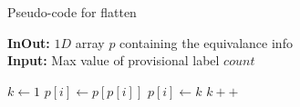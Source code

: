 \begin{algorithm}[H]
\small
{
	\caption{Pseudo-code for flatten \cite{Wu2009_LRPC}}
	\label{alg:flatten}
	\textbf{InOut:} $1D$ array $p$ containing the equivalance info \\
	\textbf{Input:} Max value of provisional label $count$
	\begin{algorithmic}[1]
		\State $k \gets 1$
				\State $p[i] \gets p[p[i]]$
			\Else
				\State $p[i] \gets k$
				\State $k++$
			\EndIf
		\EndFor
	\EndFunction
	\end{algorithmic}	
}
\end{algorithm}

